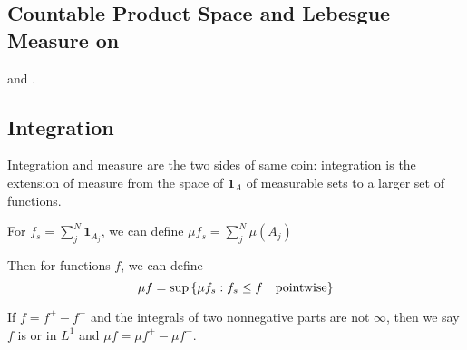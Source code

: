 \subsection{Countable Product Space and Lebesgue Measure on }

 and . 

\subsection{Integration}

Integration and measure are the two sides of same coin: integration is the extension of measure from the space of  \(\mathbf{1}_{A}\) of measurable sets to a larger set of functions. 

For  \(f_{s} = \sum^{N}_{j} \mathbf{1}_{A_{j}}\), we can define \(\mu f_{s} = \sum^{N}_{j} \mu(A_{j})\)


Then for  functions \(f\), we can define 
\begin{equation*}
    \mu f = \sup \Bqty{\mu f_{s} : f_{s} \leq f \quad \text{pointwise}}
\end{equation*}

If \(f = f^{+} - f^{-}\) and the integrals of two nonnegative parts are not \(\infty\), then we say \(f\) is  or in \({L}^{1}\) and \(\mu f = \mu f^{+} - \mu f^{-}\).  

